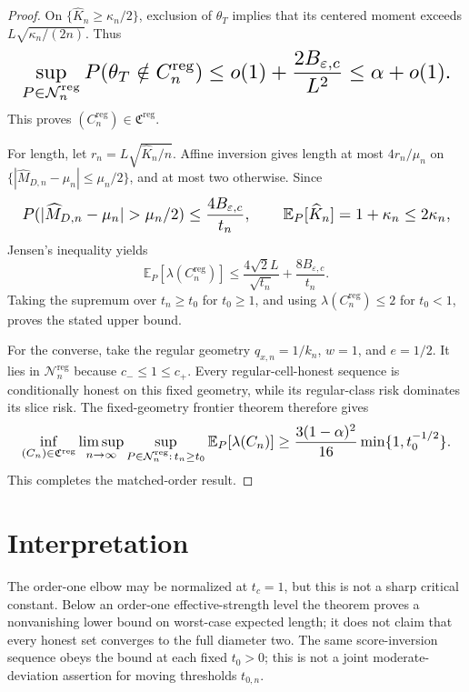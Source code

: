 \documentclass{article}
\begin{document}
\begin{proof}
On \(\{\widehat K_n\ge\kappa_n/2\}\), exclusion of \(\theta_T\) implies that its centered moment exceeds \(L\sqrt{\kappa_n/(2n)}\). Thus
\[
\makebox[\linewidth][c]{\resizebox{0.98\linewidth}{!}{\(\displaystyle \sup_{P\in\mathcal N_n^{\mathrm{reg}}}
 P(\theta_T\notin C_n^{\mathrm{reg}})
 \le o(1)+\frac{2B_{\varepsilon,c}}{L^2}
 \le\alpha+o(1).\)}}
\]
This proves \((C_n^{\mathrm{reg}})\in\mathfrak C^{\mathrm{reg}}\).

For length, let \(r_n=L\sqrt{\widehat K_n/n}\). Affine inversion gives length at most \(4r_n/\mu_n\) on \(\{|\widehat M_{D,n}-\mu_n|\le\mu_n/2\}\), and at most two otherwise. Since
\[
\makebox[\linewidth][c]{\resizebox{0.98\linewidth}{!}{\(\displaystyle P(|\widehat M_{D,n}-\mu_n|>\mu_n/2)
 \le\frac{4B_{\varepsilon,c}}{t_n},
 \qquad
 \mathbb E_P[\widehat K_n]=1+\kappa_n\le2\kappa_n,\)}}
\]
Jensen's inequality yields
\[
 \mathbb E_P[\lambda(C_n^{\mathrm{reg}})]
 \le\frac{4\sqrt2L}{\sqrt{t_n}}
 +\frac{8B_{\varepsilon,c}}{t_n}.
\]
Taking the supremum over \(t_n\ge t_0\) for \(t_0\ge1\), and using \(\lambda(C_n^{\mathrm{reg}})\le2\) for \(t_0<1\), proves the stated upper bound.

For the converse, take the regular geometry \(q_{x,n}=1/k_n\), \(w=1\), and \(e=1/2\). It lies in \(\mathcal N_n^{\mathrm{reg}}\) because \(c_-\le1\le c_+\). Every regular-cell-honest sequence is conditionally honest on this fixed geometry, while its regular-class risk dominates its slice risk. The fixed-geometry frontier theorem therefore gives
\[
\makebox[\linewidth][c]{\resizebox{0.98\linewidth}{!}{\(\displaystyle \inf_{(C_n)\in\mathfrak C^{\mathrm{reg}}}
 \limsup_{n\to\infty}
 \sup_{P\in\mathcal N_n^{\mathrm{reg}}:\,t_n\ge t_0}
 \mathbb E_P[\lambda(C_n)]
 \ge\frac{3(1-\alpha)^2}{16}
 \min\{1,t_0^{-1/2}\}.\)}}
\]
This completes the matched-order result.
\end{proof}

\section{Interpretation}

The order-one elbow may be normalized at \(t_c=1\), but this is not a sharp critical constant.  Below an order-one effective-strength level the theorem proves a nonvanishing lower bound on worst-case expected length; it does not claim that every honest set converges to the full diameter two.  The same score-inversion sequence obeys the bound at each fixed \(t_0>0\); this is not a joint moderate-deviation assertion for moving thresholds \(t_{0,n}\).
\end{document}
